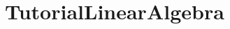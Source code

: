 \hypertarget{group___tutorial_linear_algebra}{}\section{Tutorial\+Linear\+Algebra}
\label{group___tutorial_linear_algebra}
